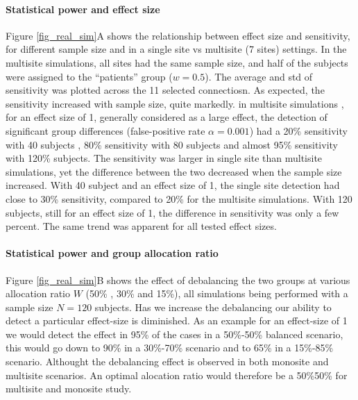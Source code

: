 \documentclass[authoryear]{elsarticle}
\begin{document}
\paragraph{Statistical power and effect size} Figure \ref{fig_real_sim}A shows the relationship between effect size and sensitivity, for different sample size and in a single site vs multisite (7 sites) settings. In the multisite simulations, all sites had the same sample size, and half of the subjects were assigned to the ``patients'' group ($w=0.5$). The average and std of sensitivity was plotted across the 11 selected connectiosn. As expected, the sensitivity increased with sample size, quite markedly. in multisite simulations , for an effect size of 1, generally considered as a large effect, the detection of significant group differences (false-positive rate $\alpha=0.001$) had a 20\% sensitivity with 40 subjects , 80\% sensitivity with 80 subjects and almost 95\% sensitivity with 120\% subjects. The sensitivity was larger in single site than multisite simulations, yet the difference between the two decreased when the sample size increased. With 40 subject and an effect size of 1, the single site detection had close to 30\% sensitivity, compared to 20\% for the multisite simulations. With 120 subjects, still for an effect size of 1, the difference in sensitivity was only a few percent. The same trend was apparent for all tested effect sizes. 

\paragraph{Statistical power and group allocation ratio} Figure \ref{fig_real_sim}B shows the effect of debalancing the two groups at various allocation ratio $W$ (50\% , 30\% and 15\%), all simulations being performed with a sample size $N=120$  subjects. Has we increase the debalancing our ability to detect a particular effect-size is diminished. As an example for an effect-size of 1 we would detect the effect in 95\% of the cases in a 50\%-50\% balanced scenario, this would go down to 90\% in a 30\%-70\% scenario and to 65\% in a 15\%-85\% scenario. Althought the debalancing effect  is observed in both monosite and multisite scenarios. An optimal alocation ratio would therefore be a 50\%50\% for multisite and monosite study.
\end{document}
